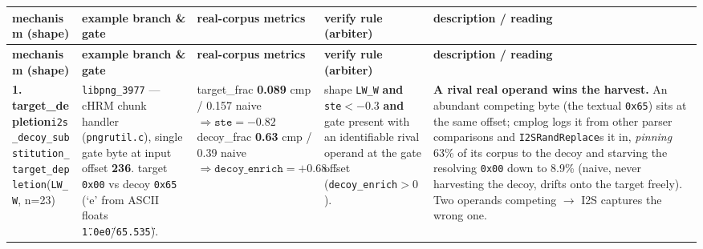 \documentclass[9pt]{extarticle}
\begin{document}
\begin{longtable}{>{\raggedright\arraybackslash}p{3.3cm} >{\raggedright\arraybackslash}p{3.9cm} >{\raggedright\arraybackslash}p{3.2cm} >{\raggedright\arraybackslash}p{4.1cm} >{\raggedright\arraybackslash}p{7.0cm}}
\toprule
\rowcolor{hdr}\color{white}\textbf{mechanism (shape)} & \color{white}\textbf{example branch \& gate} & \color{white}\textbf{real-corpus metrics} & \color{white}\textbf{verify rule (arbiter)} & \color{white}\textbf{description / reading} \\
\midrule
\endfirsthead
\toprule
\rowcolor{hdr}\color{white}\textbf{mechanism (shape)} & \color{white}\textbf{example branch \& gate} & \color{white}\textbf{real-corpus metrics} & \color{white}\textbf{verify rule (arbiter)} & \color{white}\textbf{description / reading} \\
\midrule
\endhead
\textbf{1. target\_depletion}\newline \texttt{i2s\_decoy\_}\linebreak\texttt{substitution\_}\linebreak\texttt{target\_depletion}\newline (\texttt{LW\_W}, n=23) & \texttt{libpng\_3977} --- cHRM chunk handler (\texttt{pngrutil.c}), single gate byte at input offset \textbf{236}. target \texttt{0x00} vs decoy \texttt{0x65} (`e' from ASCII floats \texttt{\"1.0e0\"}/\texttt{\"65.535\"}). & target\_frac \textbf{0.089} cmp / 0.157 naive $\Rightarrow \texttt{ste}=\mathbf{-0.82}$\newline decoy\_frac \textbf{0.63} cmp / 0.39 naive $\Rightarrow \texttt{decoy\_enrich}=\mathbf{+0.68}$ & shape \texttt{LW\_W} \textbf{and} \texttt{ste}$<-0.3$ \textbf{and} gate present with an identifiable rival operand at the gate offset (\texttt{decoy\_enrich}$>0$). & \textbf{A rival real operand wins the harvest.} An abundant competing byte (the textual \texttt{0x65}) sits at the same offset; cmplog logs it from other parser comparisons and \texttt{I2SRandReplace}s it in, \emph{pinning} 63\% of its corpus to the decoy and starving the resolving \texttt{0x00} down to 8.9\% (naive, never harvesting the decoy, drifts onto the target freely). Two operands competing $\to$ I2S captures the wrong one. \\
\midrule

\end{longtable}
\end{document}
